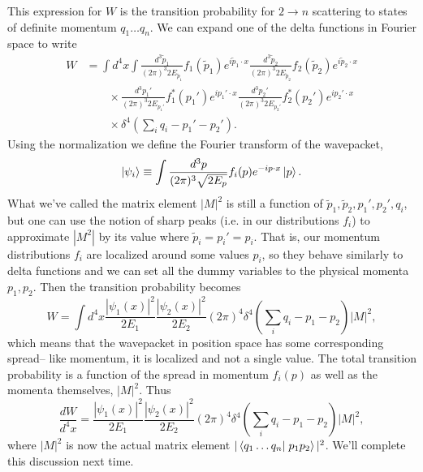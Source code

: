 This expression for $W$ is the transition probability for $2\to n$ scattering to states of definite momentum $q_1\ldots q_n$.
We can expand one of the delta functions in Fourier space to write 
\begin{align*}
    W&=\int d^4x \int \frac{d^3\tilde p_1}{(2\pi)^3 2E_{\tilde p_1}} f_1(\tilde p_1) e^{i\tilde p_1 \cdot x}\frac{d^3\tilde p_2}{(2\pi)^3 2E_{\tilde p_2}} f_2(\tilde p_2) e^{i\tilde p_2 \cdot x}\\
    &{}\qquad \times \frac{d^3 p_1'}{(2\pi)^3 2E_{p_1'}} f_1^*(p_1') e^{ip_1' \cdot x} \frac{d^3 p_2'}{(2\pi)^3 2E_{p_2'}} f_2^*(p_2') e^{ip_2' \cdot x}\\
    &{}\qquad \times \delta^4(\sum_i q_i - p_1'-p_2').
\end{align*}
Using the normalization we define the Fourier transform of the wavepacket,
$$\left| \psi_i \right>\equiv \int \frac{d^3p}{(2\pi)^3\sqrt{2E_p}}f_i(p) e^{-ip\cdot x}\left| p \right>.$$
What we've called the matrix element $|M|^2$ is still a function of $\tilde p_1, \tilde p_2,p_1', p_2', q_i$, but one can use the notion of sharp peaks (i.e. in our distributions $f_i$) to approximate $|M^2|$ by its value where $\tilde p_i=p_i' = p_i.$ That is, our momentum distributions $f_i$ are localized around some values $p_i$, so they behave similarly to delta functions and we can set all the dummy variables to the physical momenta $p_1,p_2$. Then the transition probability becomes
$$W=\int d^4x \frac{|\psi_1 (x)|^2}{2E_1}\frac{|\psi_2(x)|^2}{2E_2}(2\pi)^4 \delta^4(\sum_i q_i-p_1-p_2)|M|^2,$$
which means that the wavepacket in position space has some corresponding spread-- like momentum, it is localized and not a single value. The total transition probability is a function of the spread in momentum $f_i(p)$ as well as the momenta themselves, $|M|^2$. Thus
$$\frac{dW}{d^4x}=\frac{|\psi_1 (x)|^2}{2E_1}\frac{|\psi_2(x)|^2}{2E_2}(2\pi)^4 \delta^4(\sum_i q_i-p_1-p_2)|M|^2,$$
where $|M|^2$ is now the actual matrix element $|\braket{q_1\ldots q_n}{p_1p_2}|^2$. We'll complete this discussion next time.